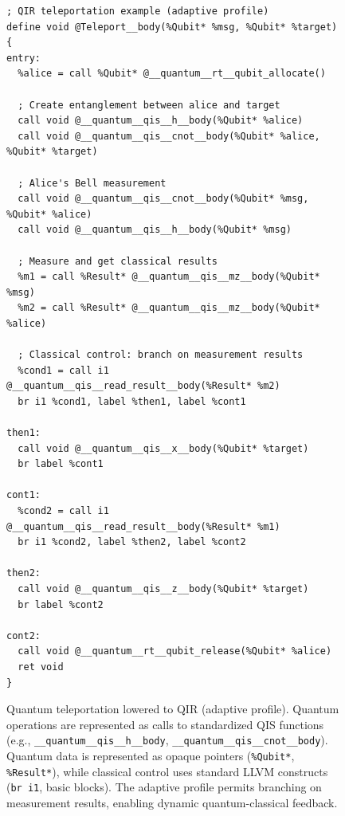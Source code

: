 \begin{figure}[t]
\begin{verbatim}
; QIR teleportation example (adaptive profile)
define void @Teleport__body(%Qubit* %msg, %Qubit* %target) {
entry:
  %alice = call %Qubit* @__quantum__rt__qubit_allocate()
  
  ; Create entanglement between alice and target
  call void @__quantum__qis__h__body(%Qubit* %alice)
  call void @__quantum__qis__cnot__body(%Qubit* %alice, %Qubit* %target)
  
  ; Alice's Bell measurement
  call void @__quantum__qis__cnot__body(%Qubit* %msg, %Qubit* %alice)
  call void @__quantum__qis__h__body(%Qubit* %msg)
  
  ; Measure and get classical results
  %m1 = call %Result* @__quantum__qis__mz__body(%Qubit* %msg)
  %m2 = call %Result* @__quantum__qis__mz__body(%Qubit* %alice)
  
  ; Classical control: branch on measurement results
  %cond1 = call i1 @__quantum__qis__read_result__body(%Result* %m2)
  br i1 %cond1, label %then1, label %cont1
  
then1:
  call void @__quantum__qis__x__body(%Qubit* %target)
  br label %cont1
  
cont1:
  %cond2 = call i1 @__quantum__qis__read_result__body(%Result* %m1)
  br i1 %cond2, label %then2, label %cont2
  
then2:
  call void @__quantum__qis__z__body(%Qubit* %target)
  br label %cont2
  
cont2:
  call void @__quantum__rt__qubit_release(%Qubit* %alice)
  ret void
}
\end{verbatim}
\caption{Quantum teleportation lowered to QIR (adaptive profile). Quantum operations are represented as calls to standardized QIS functions (e.g., \texttt{\_\_quantum\_\_qis\_\_h\_\_body}, \texttt{\_\_quantum\_\_qis\_\_cnot\_\_body}). Quantum data is represented as opaque pointers (\texttt{\%Qubit*}, \texttt{\%Result*}), while classical control uses standard LLVM constructs (\texttt{br i1}, basic blocks). The adaptive profile permits branching on measurement results, enabling dynamic quantum-classical feedback.}
\label{fig:qir-teleport}
\end{figure}
